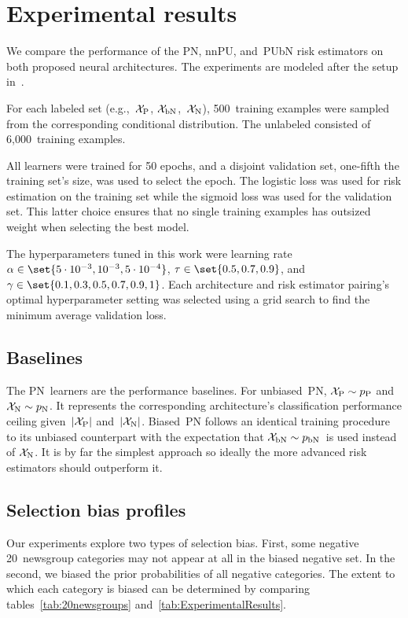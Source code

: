 \section{Experimental results}\label{sec:ExperimentalResults}

We compare the performance of the PN, nnPU, and~PUbN risk estimators on both proposed neural architectures.  The experiments are modeled after the setup in~\cite{Hsieh:2018}.

For each labeled set (e.g.,~$\mathcal{X}_{\textnormal{P}}$, $\mathcal{X}_{\textnormal{bN}}$,~$\mathcal{X}_{\textnormal{N}}$), 500~training examples were sampled from the corresponding conditional distribution.  The unlabeled consisted of 6,000~training examples.

All learners were trained for 50 epochs, and a disjoint validation set, one-fifth the training set's size, was used to select the epoch. The logistic loss was used for risk estimation on the training set while the sigmoid loss was used for the validation set.  This latter choice ensures that no single training examples has outsized weight when selecting the best model.

The hyperparameters tuned in this work were learning rate ${\alpha \in \set{5 \cdot 10^{-3}, 10^{-3}, 5 \cdot 10^{-4}}}$, ${\tau \in \set{0.5, 0.7, 0.9}}$, and ${\gamma \in \set{0.1, 0.3, 0.5, 0.7, 0.9, 1}}$.  Each architecture and risk estimator pairing's optimal hyperparameter setting was selected using a grid search to find the minimum average validation loss.

\subsection{Baselines}

The PN~learners are the performance baselines.  For unbiased~PN, ${\mathcal{X}_{\textnormal{P}} \sim p_{\textnormal{P}}}$ and ${\mathcal{X}_{\textnormal{N}} \sim p_{\textnormal{N}}}$.  It represents the corresponding architecture's classification performance ceiling given~$\lvert\mathcal{X}_{\textnormal{P}}\rvert$ and~$\lvert\mathcal{X}_{\textnormal{N}}\rvert$. Biased~PN follows an identical training procedure to its unbiased counterpart with the expectation that ${\mathcal{X}_{\textnormal{bN}} \sim p_{\textnormal{bN}}}$~is used instead of $\mathcal{X}_{\textnormal{N}}$.  It is by far the simplest approach so ideally the more advanced risk estimators should outperform it.

\subsection{Selection bias profiles}

Our experiments explore two types of selection bias.  First, some negative 20~newsgroup categories may not appear at all in the biased negative set.  In the second, we biased the prior probabilities of all negative categories.  The extent to which each category is biased can be determined by comparing tables~\ref{tab:20newsgroups} and~\ref{tab:ExperimentalResults}.

